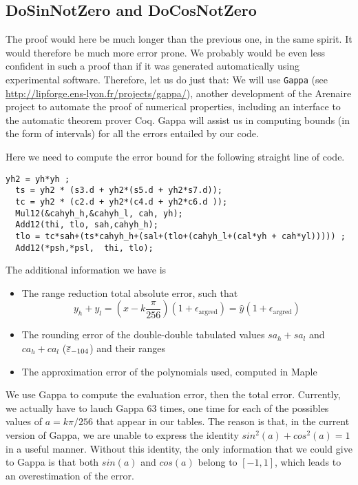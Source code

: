 \subsection{DoSinNotZero and DoCosNotZero\label{sec:dosinnotzero} }

The proof would here be much longer than the previous one, in the same
spirit. It would therefore be much more error prone. We probably would
be even less confident in such a proof than if it was generated
automatically using experimental software. Therefore, let us do just
that: We will use \texttt{Gappa} (see
\url{http://lipforge.ens-lyon.fr/projects/gappa/}), another
development of the Arenaire project to automate the proof of numerical
properties, including an interface to the automatic theorem prover
Coq. Gappa will assist us in computing bounds (in the form of
intervals) for all the errors entailed by our code.


Here we need to compute the error bound for the following straight line of
code.

\begin{lstlisting}[caption={DoSinNotZero},firstnumber=1]
  yh2 = yh*yh ;
  ts = yh2 * (s3.d + yh2*(s5.d + yh2*s7.d));
  tc = yh2 * (c2.d + yh2*(c4.d + yh2*c6.d ));
  Mul12(&cahyh_h,&cahyh_l, cah, yh);
  Add12(thi, tlo, sah,cahyh_h);
  tlo = tc*sah+(ts*cahyh_h+(sal+(tlo+(cahyh_l+(cal*yh + cah*yl))))) ;
  Add12(*psh,*psl,  thi, tlo);
\end{lstlisting}

The additional information we have is

\begin{itemize}

\item The range reduction total absolute error, such that
  \begin{equation}
    y_h+y_l = (x-k\frac{\pi}{256})(1+\epsilon_{\mathrm{argred}})
    = \hat{y}(1+\epsilon_{\mathrm{argred}})
  \end{equation}

\item The rounding error of the double-double tabulated values
  $sa_h+sa_l$ and  $ca_h+ca_l$  (${\overline{\varepsilon}}_{-104}$) and their ranges

\item The approximation error of the polynomials used, computed in
  Maple
\end{itemize}

We use Gappa to compute the evaluation error, then the total error.
Currently, we actually have to lauch Gappa 63 times, one time for each
of the possibles values of $a=k\pi/256$ that appear in our tables. The
reason is that, in the current version of Gappa, we are unable to
express the identity $sin^2(a) + cos^2(a) = 1$ in a useful manner.
Without this identity, the only information that we could give to
Gappa is that both $sin(a)$ and $cos(a)$ belong to $[-1,1]$, which
leads to an overestimation of the error.

